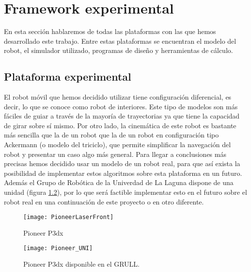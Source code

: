 \pagestyle{scrheadings}
\ihead[]{\rightmark}
\ofoot[]{\thepage{}}
\chapter{Framework experimental}\label{ch:capitulo4}
En esta sección hablaremos de todas las plataformas con las que hemos desarrollado este trabajo.
Entre estas plataformas se encuentran el modelo del robot, el simulador utilizado, programas de diseño y herramientas de cálculo.

\section{Plataforma experimental}
%
%
%
El robot móvil que hemos decidido utilizar tiene configuración diferencial, es decir, lo que se conoce como robot de interiores.
Este tipo de modelos son más fáciles de guiar a través de la mayoría de trayectorias ya que tiene la capacidad de girar sobre sí mismo.
Por otro lado, la cinemática de este robot es bastante más sencilla que la de un robot que la de un robot en configuración tipo Ackermann (o modelo del triciclo), que permite simplificar la navegación del robot y presentar un caso algo más general.
%
%
%
Para llegar a conclusiones más precisas hemos decidido usar un modelo de un robot real, para que así exista la posibilidad de implementar estos algoritmos sobre esta plataforma en un futuro.
Además el Grupo de Robótica de la Univerdad de La Laguna dispone de una unidad (figura \ref{Pioneer_3dx_UNI}), por lo que será factible implementar esto en el futuro sobre el robot real en una continuación de este proyecto o en otro diferente.
\begin{figure}[ht!]
\centering
\texttt{[image: PioneerLaserFront]}
\caption{Pioneer P3dx} \label{Pioneer_3dx}
\end{figure}
\begin{figure}[ht!]
\centering
\texttt{[image: Pioneer\_UNI]}
\caption{Pioneer P3dx disponible en el GRULL.} \label{Pioneer_3dx_UNI}
\end{figure}
%
%
%

